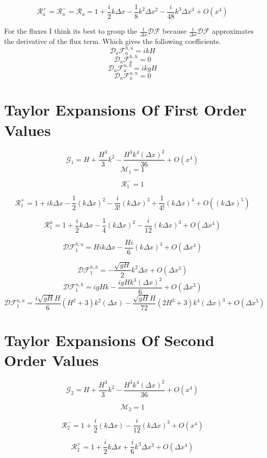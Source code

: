 \documentclass[12pt]{article}
\begin{document}
\[\mathcal{R}_a^+ = \mathcal{R}_a^-=\mathcal{R}_a = 1 + \frac{i}{2}k\Delta x   - \frac{1}{8}k^2\Delta x^2 - \frac{i}{48}k^3\Delta x^3 + O(x^{4})\]

For the fluxes I think its best to group the $ \frac{1}{\Delta x}\mathcal{D}\mathcal{F}$ because $ \frac{1}{\Delta x}\mathcal{D}\mathcal{F}$ approximates the derivative of the flux term. Which gives the following coefficients. 
\[\mathcal{D}_a\mathcal{F}^{h,u}_a = ikH\]
\[\mathcal{D}_a\mathcal{F}^{h,h}_a = 0\]
\[\mathcal{D}_a\mathcal{F}^{u,h}_a = ikgH\]
\[\mathcal{D}_a\mathcal{F}^{u,u}_a = 0\]

\section{Taylor Expansions Of First Order Values }

\[\mathcal{G}_1 = H +\frac{H^3}{3} k^2 -\frac{H^3 k^4(\Delta x)^2}{36} + O(x^{4})\]
\[\mathcal{M}_1 = 1\]

\[\mathcal{R}^-_1 =  1\]

\[\mathcal{R}^+_1 = 1 + i k\Delta x  - \frac{1}{2} (k\Delta x)^2 - \frac{i}{3!} (k\Delta x)^3 + \frac{1}{4!} (k\Delta x)^4 +  O((k\Delta x)^5)\]

\[\mathcal{R}^u_1 = 1 + \frac{i}{2}k\Delta x - \frac{1}{4} (k \Delta x)^2 - \frac{i}{12} (k \Delta x)^3 +  O( \Delta x^4)\]

\[\mathcal{D}\mathcal{F}^{h,u}_1 = Hik\Delta x  - \frac{Hi}{6} (k \Delta x)^3 +  O( \Delta x^4) \]

\[\mathcal{D}\mathcal{F}^{h,h}_1 = -\frac{\sqrt{gH}}{ 2} k^2 \Delta x + O( \Delta x^3) \]
\[\mathcal{D}\mathcal{F}^{u,h}_1 = igHk -\frac{igHk^3(\Delta x)^2}{6} +  O( \Delta x^3) \]
\[\mathcal{D}\mathcal{F}^{u,u}_1 = \frac{i\sqrt{gH}H}{6}(H^2 + 3) k^2(\Delta x) - \frac{\sqrt{gH}H}{72}(2H^2 + 3)k^4 (\Delta x)^3 + O( \Delta x^5) \]


\section{Taylor Expansions Of Second Order Values }

\[\mathcal{G}_2 = H +\frac{H^3}{3} k^2 -\frac{H^3 k^4(\Delta x)^2}{36} + O(x^{4})\]

\[\mathcal{M}_2 = 1\]

\[\mathcal{R}_2^- = 1  + \frac{i}{2} (k \Delta x) - \frac{i}{12}(k \Delta x)^3  +  O(x^{4})\]

\[\mathcal{R}_2^+ =1 + \frac{i}{2}k\Delta x + \frac{i}{6} k^3 \Delta x^3 + O\left(\Delta x ^4\right)\]
\end{document}
